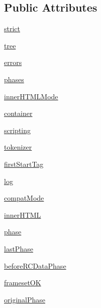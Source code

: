 \subsection*{Public Attributes}
\begin{DoxyCompactItemize}
\item 
\hyperlink{classpip_1_1__vendor_1_1html5lib_1_1html5parser_1_1HTMLParser_a274f652bac6781828607ae4562072be1}{strict}
\item 
\hyperlink{classpip_1_1__vendor_1_1html5lib_1_1html5parser_1_1HTMLParser_a70c33f3ad382e61b13e5e8557358794f}{tree}
\item 
\hyperlink{classpip_1_1__vendor_1_1html5lib_1_1html5parser_1_1HTMLParser_aa9840ea8d0b0e31f04ac50e02a2cec86}{errors}
\item 
\hyperlink{classpip_1_1__vendor_1_1html5lib_1_1html5parser_1_1HTMLParser_a7fb422bfdab1b5e768184ec62dae1d6c}{phases}
\item 
\hyperlink{classpip_1_1__vendor_1_1html5lib_1_1html5parser_1_1HTMLParser_aafc0e16e18c1387461b955b375db3918}{inner\+H\+T\+M\+L\+Mode}
\item 
\hyperlink{classpip_1_1__vendor_1_1html5lib_1_1html5parser_1_1HTMLParser_a49870dd06f984a15b4192b46be2569e6}{container}
\item 
\hyperlink{classpip_1_1__vendor_1_1html5lib_1_1html5parser_1_1HTMLParser_a589c311b3044fd94d3cdf8c279ef7208}{scripting}
\item 
\hyperlink{classpip_1_1__vendor_1_1html5lib_1_1html5parser_1_1HTMLParser_a80041b85a17a4ff87aaf73d0f5595bbc}{tokenizer}
\item 
\hyperlink{classpip_1_1__vendor_1_1html5lib_1_1html5parser_1_1HTMLParser_a710c3066ad756155442069bb8bc62cfc}{first\+Start\+Tag}
\item 
\hyperlink{classpip_1_1__vendor_1_1html5lib_1_1html5parser_1_1HTMLParser_a45b1d8261aacfbec69c1f66a1b8341ac}{log}
\item 
\hyperlink{classpip_1_1__vendor_1_1html5lib_1_1html5parser_1_1HTMLParser_a55e248468bf6a6a89d8bcb49f3a434e7}{compat\+Mode}
\item 
\hyperlink{classpip_1_1__vendor_1_1html5lib_1_1html5parser_1_1HTMLParser_a6d89084b5d4c72a191db53cefe563c2e}{inner\+H\+T\+ML}
\item 
\hyperlink{classpip_1_1__vendor_1_1html5lib_1_1html5parser_1_1HTMLParser_a253ca22e2ba3acd0ed63c7852b9445b0}{phase}
\item 
\hyperlink{classpip_1_1__vendor_1_1html5lib_1_1html5parser_1_1HTMLParser_aebe11f24db4e09d3ac70a0010fe57df4}{last\+Phase}
\item 
\hyperlink{classpip_1_1__vendor_1_1html5lib_1_1html5parser_1_1HTMLParser_a5f05a25fb5a2b8af5863f0f122f603cc}{before\+R\+C\+Data\+Phase}
\item 
\hyperlink{classpip_1_1__vendor_1_1html5lib_1_1html5parser_1_1HTMLParser_a9cbbc508cc18b682215c5b4b0e64ce11}{frameset\+OK}
\item 
\hyperlink{classpip_1_1__vendor_1_1html5lib_1_1html5parser_1_1HTMLParser_a6fb9644ae21364c3ff14acbe6d6b103f}{original\+Phase}
\end{DoxyCompactItemize}


